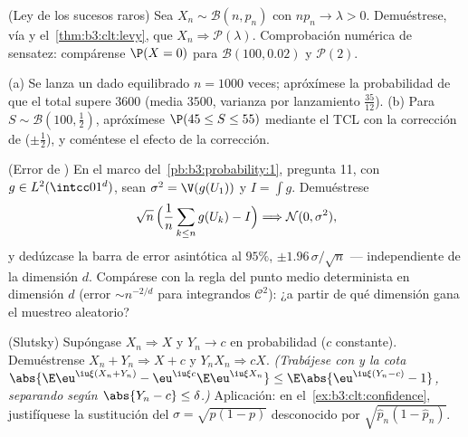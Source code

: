 \begin{exercise}[$\star\star$]\label{exo:b3:clt:5}
(Ley de los sucesos raros) Sea $X_n \sim \mathcal B(n, p_n)$ con
$np_n \to \lambda > 0$. Demuéstrese, vía
 y
el~\cref{thm:b3:clt:levy}, que $X_n \Rightarrow \mathcal
P(\lambda)$. Comprobación numérica de sensatez: compárense $\P(X = 0)$
para $\mathcal B(100, 0.02)$ y $\mathcal P(2)$.
\end{exercise}

\begin{exercise}[$\star\star$]\label{exo:b3:clt:6}
(a) Se lanza un dado equilibrado $n = 1000$ veces; apróxímese la
probabilidad de que el total supere $3600$ (media $3500$, varianza por
lanzamiento $\frac{35}{12}$). (b) Para
$S \sim \mathcal B(100, \frac12)$, apróxímese $\P(45 \leq S \leq 55)$
mediante el TCL con la corrección de
 ($\pm\frac12$), y
coméntese el efecto de la corrección.
\end{exercise}

\begin{exercise}[$\star\star$]\label{exo:b3:clt:7}
(Error de ) En el marco
del~\cref{pb:b3:probability:1}, pregunta 11, con $g \in
L^2(\intcc01^d)$, sean $\sigma^2 = \V(g(U_1))$ y $I = \int
g$. Demuéstrese
\[
\sqrt n\,\Bigl(\frac1n\sum_{k\leq n}g(U_k) - I\Bigr)
\Longrightarrow \mathcal N(0, \sigma^2),
\]
y dedúzcase la barra de error asintótica al $95\%$, $\pm
1.96\,\sigma/\sqrt n$ ---
independiente de la dimensión
$d$. Compárese con la regla del punto medio determinista en dimensión
$d$ (error $\sim n^{-2/d}$ para integrandos $\mathcal C^2$): ¿a partir
de qué dimensión gana el muestreo aleatorio?
\end{exercise}

\begin{exercise}[$\star\star\star$]\label{exo:b3:clt:8}
(Slutsky) Supóngase $X_n \Rightarrow X$ y $Y_n \to c$ en probabilidad
($c$ constante). Demuéstrense $X_n + Y_n \Rightarrow X +
c$ y $Y_nX_n \Rightarrow cX$. \emph{(Trabájese con
 y la cota
$\abs{\E\eu^{\iu\xi
(X_n+Y_n)} - \eu^{\iu\xi c}\E\eu^{\iu\xi X_n}} \leq
\E\abs{\eu^{\iu\xi(Y_n - c)} - 1}$, separando según $\abs{Y_n - c}
\leq \delta$.)} Aplicación: en el~\cref{ex:b3:clt:confidence},
justifíquese la sustitución del $\sigma = \sqrt{p(1-p)}$ desconocido por
$\sqrt{\hat p_n(1 - \hat
p_n)}$.
\end{exercise}

